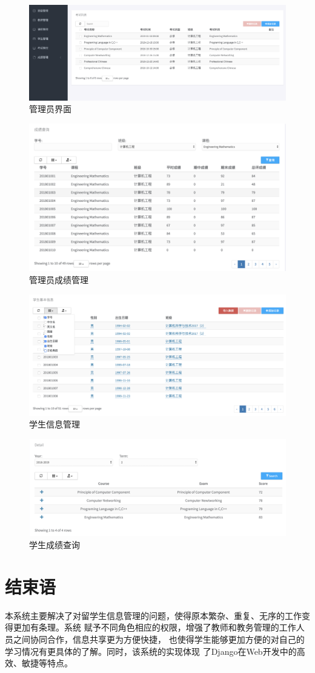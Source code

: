 \documentclass{ede}
\begin{document}
\begin{figure}%
  \centering
  \includegraphics [width=.8\columnwidth]{./img/manager}    
  \caption{管理员界面}\label{fig:admin}
\end{figure}

\begin{figure}%
  \centering
  \includegraphics [width=.8\columnwidth]{./img/search}      
  \caption{管理员成绩管理}\label{fig:result}
\end{figure}

\begin{figure}%
  \centering
  \includegraphics [width=.8\columnwidth]{./img/student}      
  \caption{学生信息管理}\label{fig:personal}
\end{figure}

\begin{figure}%
  \centering
  \includegraphics [width=.8\columnwidth]{./img/queryscore}      
  \caption{学生成绩查询}\label{fig:query}
\end{figure}

\section{结束语}

本系统主要解决了对留学生信息管理的问题，使得原本繁杂、重复、无序的工作变得更加有条理。系统
赋予不同角色相应的权限，增强了教师和教务管理的工作人员之间协同合作，信息共享更为方便快捷，
也使得学生能够更加方便的对自己的学习情况有更具体的了解。同时，该系统的实现体现
了Django在Web开发中的高效、敏捷等特点。

\makebib
\end{document}
